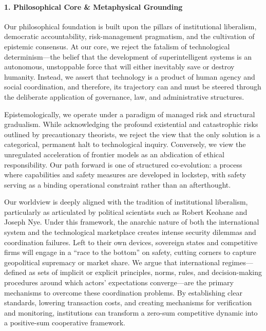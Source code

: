 \paragraph{1. Philosophical Core \& Metaphysical
Grounding}\label{philosophical-core-metaphysical-grounding-1}

Our philosophical foundation is built upon the pillars of institutional
liberalism, democratic accountability, risk-management pragmatism, and
the cultivation of epistemic consensus. At our core, we reject the
fatalism of technological determinism---the belief that the development
of superintelligent systems is an autonomous, unstoppable force that
will either inevitably save or destroy humanity. Instead, we assert that
technology is a product of human agency and social coordination, and
therefore, its trajectory can and must be steered through the deliberate
application of governance, law, and administrative structures.

Epistemologically, we operate under a paradigm of managed risk and
structural gradualism. While acknowledging the profound existential and
catastrophic risks outlined by precautionary theorists, we reject the
view that the only solution is a categorical, permanent halt to
technological inquiry. Conversely, we view the unregulated acceleration
of frontier models as an abdication of ethical responsibility. Our path
forward is one of structured co-evolution: a process where capabilities
and safety measures are developed in lockstep, with safety serving as a
binding operational constraint rather than an afterthought.

Our worldview is deeply aligned with the tradition of institutional
liberalism, particularly as articulated by political scientists such as
Robert Keohane and Joseph Nye. Under this framework, the anarchic nature
of both the international system and the technological marketplace
creates intense security dilemmas and coordination failures. Left to
their own devices, sovereign states and competitive firms will engage in
a ``race to the bottom'' on safety, cutting corners to capture
geopolitical supremacy or market share. We argue that international
regimes---defined as sets of implicit or explicit principles, norms,
rules, and decision-making procedures around which actors' expectations
converge---are the primary mechanisms to overcome these coordination
problems. By establishing clear standards, lowering transaction costs,
and creating mechanisms for verification and monitoring, institutions
can transform a zero-sum competitive dynamic into a positive-sum
cooperative framework.

